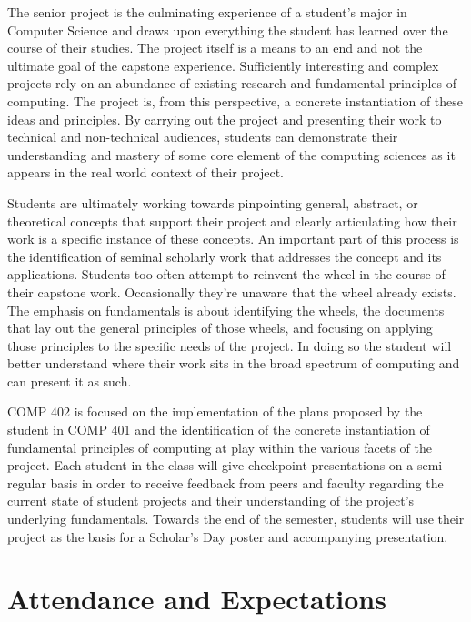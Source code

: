 \documentclass[nobib]{tufte-handout}
\begin{document}
The senior project is the culminating experience of a student's major in Computer Science and draws upon everything the student has learned over the course of their studies. The project itself is a means to an end and not the ultimate goal of the capstone experience. Sufficiently interesting and complex projects rely on an abundance of existing research and fundamental principles of computing.  The project is, from this perspective, a concrete instantiation of these ideas and principles. By carrying out the project and presenting their work to technical and non-technical audiences, students can demonstrate their understanding and mastery of some core element of the computing sciences as it appears in the real world context of their project.

Students are ultimately working towards pinpointing general, abstract, or theoretical concepts that support their project and clearly articulating how their work is a specific instance of these concepts. An important part of this process is the identification of seminal scholarly work that addresses the concept and its applications. Students too often attempt to reinvent the wheel in the course of their capstone work. Occasionally they're unaware that the wheel already exists. The emphasis on fundamentals is about identifying the wheels, the documents that lay out the general principles of those wheels, and focusing on applying those principles to the specific needs of the project. In doing so the student will better understand where their work sits in the broad spectrum of computing and can present it as such.

COMP 402 is focused on the implementation of the plans proposed by the student in COMP 401 and the identification of the concrete instantiation of fundamental principles of computing at play within the various facets of the project. Each student in the class will give checkpoint presentations on a semi-regular basis in order to receive feedback from peers and faculty regarding the current state of student projects and their understanding of the project's underlying fundamentals.   Towards the end of the semester, students will use their project as the basis for a Scholar's Day poster and accompanying presentation.



\section{Attendance and Expectations}
\end{document}
